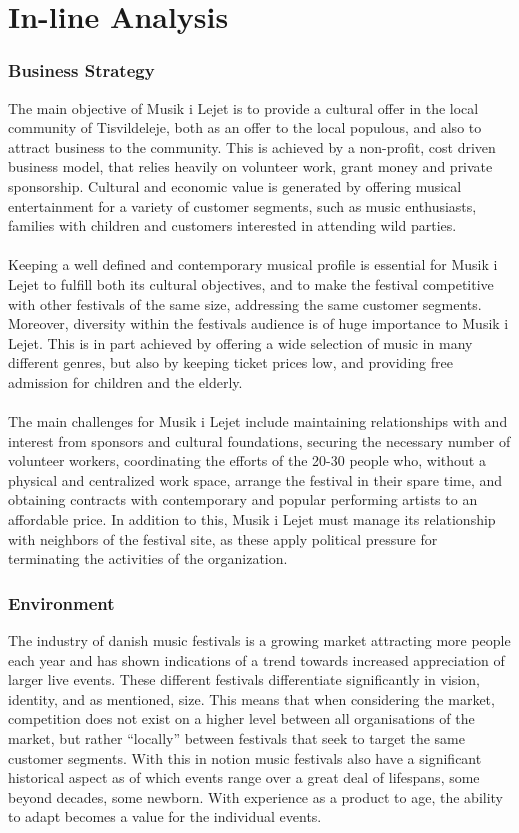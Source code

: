 \part{In-line Analysis}


\section{Business Strategy}
The main objective of Musik i Lejet is to provide a cultural offer in the local community of Tisvildeleje, both as an offer to the local populous, and also to attract business to the community. This is achieved by a non-profit, cost driven business model, that relies heavily on volunteer work, grant money and private sponsorship. Cultural and economic value is generated by offering musical entertainment for a variety of customer segments, such as music enthusiasts, families with children and customers interested in attending wild parties.
\\ \\
Keeping a well defined and contemporary musical profile is essential for Musik i Lejet to fulfill both its cultural objectives, and to make the festival competitive with other festivals of the same size, addressing the same customer segments. Moreover, diversity within the festivals audience is of huge importance to Musik i Lejet. This is in part achieved by offering a wide selection of music in many different genres, but also by keeping ticket prices low, and providing free admission for children and the elderly.
\\ \\
The main challenges for Musik i Lejet include maintaining relationships with and interest from sponsors and cultural foundations, securing the necessary number of volunteer workers, coordinating the efforts of the 20-30 people who, without a physical and centralized work space, arrange the festival in their spare time, and obtaining contracts with contemporary and popular performing artists to an affordable price. In addition to this, Musik i Lejet must manage its relationship with neighbors of the festival site, as these apply political pressure for terminating the activities of the organization.

\section{Environment}
The industry of danish music festivals is a growing market attracting more people each year and has shown indications of a trend towards increased appreciation of larger live events. These different festivals differentiate significantly in vision, identity, and as mentioned, size. This means that when considering the market, competition does not exist on a higher level between all organisations of the market, but rather “locally” between festivals that seek to target the same customer segments. With this in notion music festivals also have a significant historical aspect as of which events range over a great deal of lifespans, some beyond decades, some newborn. With experience as a product to age, the ability to adapt becomes a value for the individual events. 

